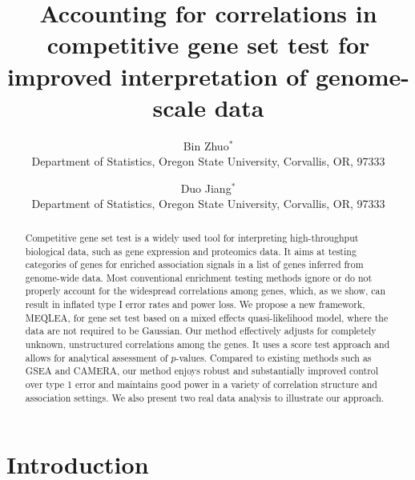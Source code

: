 \documentclass[useAMS,usenatbib, galley]{biom}
\title[This is an Example of Recto Running Head]{Accounting for correlations in competitive gene set test for improved interpretation of genome-scale data}
\author{Bin Zhuo$^{*}$\email{zhuob@oregonstate.edu} \\
	   Department of Statistics, Oregon State University, Corvallis, OR, 97333
	   \and 
	   Duo Jiang$^{*}$\email{jiangd@stat.oregonstate.edu}\\
	    Department of Statistics, Oregon State University, Corvallis, OR, 97333
	   }
\newcommand{\OurMethod}{MEQLEA}
\begin{document}




\label{firstpage}


\begin{abstract}
Competitive gene set test is a widely used tool for interpreting high-throughput biological data, such as gene expression and proteomics data. It aims at testing categories of genes for enriched association signals in a list of genes inferred from genome-wide data. Most conventional enrichment testing methods ignore or do not properly account for the widespread correlations among genes, which, as we show, can result in inflated type I error rates and power loss. We propose a new framework, \OurMethod, for gene set test based on a mixed effects quasi-likelihood model, where the data are not required to be Gaussian. Our method effectively adjusts for completely unknown, unstructured correlations among the genes. It uses a score test approach and allows for analytical assessment of $p$-values. Compared to existing methods such as GSEA and CAMERA, our method enjoys robust and substantially improved control over type 1 error and maintains good power in a variety of correlation structure and association settings. We also present two real data analysis to illustrate our approach.
\end{abstract}

%
%

\begin{keywords}
\end{keywords}

\maketitle

	\section{Introduction}\label{section:introduction}
	
\end{document}
